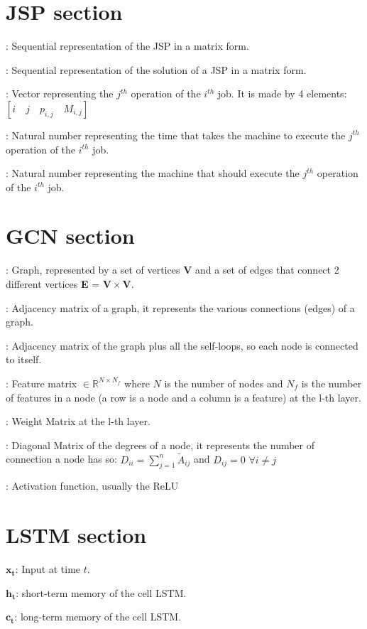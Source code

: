 \documentclass[12pt]{book}
\begin{document}
\begin{description}

\section*{JSP section}
  \item[$\mathbf{S_{seq}}$]: Sequential representation of the JSP in a matrix form.
  \item[$\mathbf{S_{seq}}$]: Sequential representation of the solution of a JSP in a matrix form.
  \item[$\mathbf{o_{i,j}}$]: Vector representing the $j^{th}$ operation of the $i^{th}$ job. It is made by 4 elements: $[i\quad j\quad p_{i,j}\quad M_{i,j}]$
  \item[$\mathbf{p_{i,j}}$]: Natural number representing the time that takes the machine to execute the $j^{th}$ operation of the $i^{th}$ job.
  \item[$\mathbf{M_{i,j}}$]: Natural number representing the machine that should execute the $j^{th}$ operation of the $i^{th}$ job.

\section*{GCN section}
  \item[G = (V,E)]: Graph, represented by a set of vertices \textbf{V} and a set of edges that connect 2 different vertices \textbf{E} = $\mathbf{V}\times\mathbf{V}$.
  \item[A]: Adjacency matrix of a graph, it represents the various connections (edges) of a graph.
  \item[$\mathbf{\tilde{A}}$]: Adjacency matrix of the graph plus all the self-loops, so each node is connected to itself.
  \item[$\mathbf{H^{(l)}}$]: Feature matrix $\in \mathbb{R}^{N \times N_f}$ where $N$ is the number of nodes and $N_f$ is the number of features in a node (a row is a node and a column is a feature) at the l-th layer.
  \item[$\mathbf{W^{(l)}}$]: Weight Matrix at the l-th layer.
  \item[$\mathbf{\tilde{D}}$]: Diagonal Matrix of the degrees of a node, it represents the number of connection a node has so: $D_{ii}=\sum_{j=1}^{n} \tilde{A}_{ij}$ and $D_{ij}=0$ $\forall i\neq j$
  \item[$\boldsymbol{\sigma}$]: Activation function, usually the ReLU

\section*{LSTM section}
  \item{$\mathbf{x_t}$}: Input at time $t$.
  \item{$\mathbf{h_t}$}: short-term memory of the cell LSTM.
  \item{$\mathbf{c_t}$}: long-term memory of the cell LSTM.


\end{description}
\end{document}
